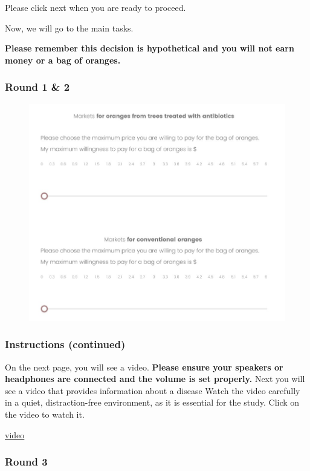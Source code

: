 \documentclass[12pt]{article}
\begin{document}
\vspace{0.5cm}
 Please click next when you are ready to proceed.

Now, we will go to the main tasks. 

\textbf{Please remember this decision is hypothetical and you will not earn money or a bag of oranges.}

\clearpage

\subsubsection*{\centering \textbf{Round 1 \& 2}}

\begin{figure}[H]
    \centering
    \includegraphics[width=0.8\linewidth]{BDM_market.jpg}
    \caption{}
    \label{fig:BDM_market}
\end{figure}

\clearpage

\subsubsection*{\textbf{Instructions (continued)}}
On the next page, you will see a video. \textbf{Please ensure your speakers or headphones are connected and the volume is set properly.} Next you will see a video that provides information about a disease Watch the video carefully in a quiet, distraction-free environment, as it is essential for the study.
\vspace{0.5cm}
Click on the video to watch it.

\href{https://www.youtube.com/watch?v=_AqMBjB0ChM}{video}
\clearpage


 \subsubsection*{\centering Round 3}
\end{document}
